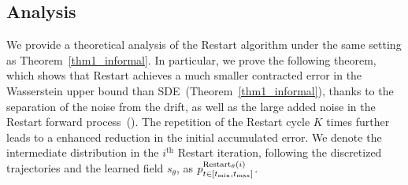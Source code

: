 \subsection{Analysis}
 \label{sec:ana}

We provide a theoretical analysis of the Restart algorithm under the same setting as Theorem~\ref{thm1_informal}. In particular, we prove the following theorem, which shows that Restart achieves a much smaller contracted error in the Wasserstein upper bound than SDE~(Theorem~\ref{thm1_informal}), thanks to the separation of the noise from the drift, as well as the large added noise in the Restart forward process~(). The repetition of the Restart cycle $K$ times further leads to a enhanced reduction in the initial accumulated error. We denote the intermediate distribution in the $i^{\textrm{th}}$ Restart iteration, following the discretized trajectories and the learned field $s_\theta$, as {\footnotesize $p^{{\textrm{Restart}_\theta}(i)}_{t \in [t_{\textrm{min}}, t_{\textrm{max}}]}$}.


